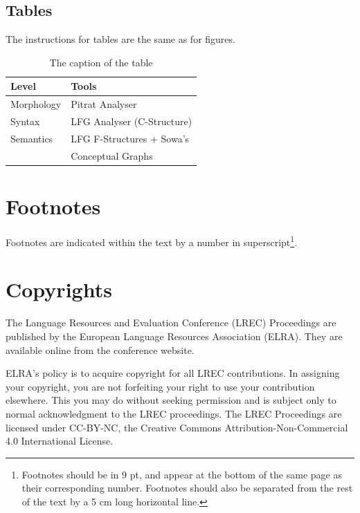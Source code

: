\documentclass[10pt, a4paper]{article}
\begin{document}
\subsection{Tables}

The instructions for tables are the same as for figures.

\begin{table}[!ht]
\begin{center}
\begin{tabularx}{\columnwidth}{|l|X|}

      \hline
      Level&Tools\\
      \hline
      Morphology & Pitrat Analyser\\
      \hline
      Syntax & LFG Analyser (C-Structure)\\
      \hline
     Semantics & LFG F-Structures + Sowa's\\
     & Conceptual Graphs\\
      \hline

\end{tabularx}
\caption{The caption of the table}
 \end{center}
\end{table}

\section{Footnotes}

Footnotes are indicated within the text by a number in superscript\footnote{Footnotes should be in  9 pt, and appear at the bottom of the same page as their corresponding number. Footnotes should also be separated from the rest of the text by a 5 cm long horizontal line.}.

\section{Copyrights}

The Language Resources and Evaluation Conference (LREC) Proceedings are published by the European Language Resources Association (ELRA). They are available online from the conference website.

ELRA's policy is to acquire copyright for all LREC contributions. In assigning your copyright, you are not forfeiting your right to use your contribution elsewhere. This you may do without seeking permission and is subject only to normal acknowledgment to the LREC proceedings. The LREC Proceedings are licensed under CC-BY-NC, the Creative Commons Attribution-Non-Commercial 4.0 International License.
\end{document}
